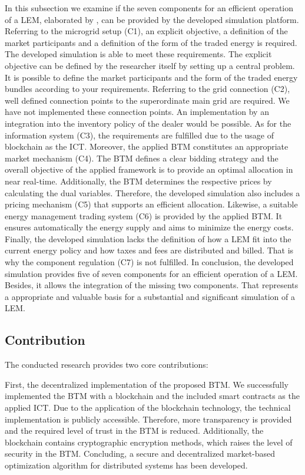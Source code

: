 In this subsection we examine if the seven components for an efficient operation of a LEM,
 elaborated by , can be 
provided by the developed simulation platform.
Referring to the microgrid setup (C1), an explicit objective, a definition of the market participants 
and a definition of the form of the traded energy is required. The developed simulation 
is able to meet these requirements. The explicit objective can be defined by the researcher itself by 
setting up a central problem. It is possible to define the market participants and the form of the traded energy bundles
according to your requirements.
Referring to the grid connection (C2), well defined connection points to the superordinate main grid are required.
We have not implemented these connection points. An implementation by an integration into the inventory 
policy of the dealer would be possible. 
As for the information system (C3), the requirements are fulfilled due to the usage of blockchain as the ICT.
Moreover, the applied BTM constitutes an appropriate market mechanism (C4). The BTM defines a clear bidding 
strategy and the overall objective of the applied framework is to provide an optimal allocation in near real-time. 
Additionally, the BTM determines the respective prices by calculating the dual variables.
Therefore, the developed simulation also includes a pricing mechanism (C5) that supports an efficient allocation.
Likewise, a suitable energy management trading system (C6) is provided by the applied BTM. 
It ensures automatically the energy supply and aims to minimize the energy costs.
Finally, the developed simulation lacks the definition of how a LEM fit into 
the current energy policy and how taxes and fees are distributed and billed. 
That is why the component regulation (C7) is not fulfilled. 
In conclusion, the developed simulation provides five of seven components for an efficient operation of a LEM. 
Besides, it allows the integration of the missing two components.
That represents a appropriate and valuable basis for a substantial and significant simulation of a LEM. 

\subsection{Contribution}
The conducted research provides two core contributions:

First, the decentralized implementation of the proposed BTM. 
We successfully implemented the BTM with a blockchain and the included smart contracts 
as the applied ICT. 
Due to the application of the blockchain technology, the technical implementation
is publicly accessible.
Therefore, more transparency is provided and the required level of trust in the BTM
is reduced. Additionally, the blockchain contains cryptographic encryption methods,
which raises the level of security in the BTM.
Concluding, a secure and decentralized market-based optimization algorithm for distributed systems has 
been developed.

